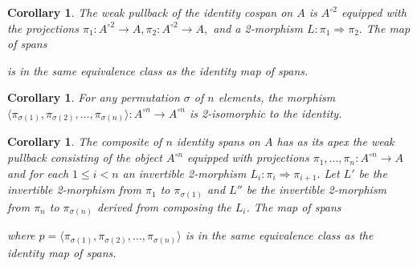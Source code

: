 \documentclass{article}
\newcommand{\maps}{\colon}
\newtheorem{cor}[thm]{Corollary}
\begin{document}
\begin{cor}
  The weak pullback of the identity cospan on $A$ is $A^{\circ 2}$ equipped with the projections $\pi_1\maps A^{\circ 2}\to A, \pi_2\maps A^{\circ 2}\to A,$ and a 2-morphism $L\maps \pi_1\Rightarrow \pi_2.$  The map of spans
  \begin{center}
  \end{center}
  is in the same equivalence class as the identity map of spans.
\end{cor}

\begin{cor}
  For any permutation $\sigma$ of $n$ elements, the morphism $\langle \pi_{\sigma(1)}, \pi_{\sigma(2)}, \ldots, \pi_{\sigma(n)}\rangle\maps A^{\circ n} \to A^{\circ n}$ is 2-isomorphic to the identity.
\end{cor}

\begin{cor}
  \label{permute}
  The composite of $n$ identity spans on $A$ has as its apex the weak pullback consisting of the object $A^{\circ n}$ equipped with projections $\pi_1, \ldots, \pi_n\maps A^{\circ n} \to A$ and for each $1 \le i < n$ an invertible 2-morphism $L_i\maps \pi_i \Rightarrow \pi_{i+1}.$  Let $L'$ be the invertible 2-morphism from $\pi_1$ to $\pi_{\sigma(1)}$ and $L''$ be the invertible 2-morphism from $\pi_n$ to $\pi_{\sigma(n)}$ derived from composing the $L_i$.  The map of spans 
  \begin{center}
  \end{center}
  where $p = \langle \pi_{\sigma(1)}, \pi_{\sigma(2)}, \ldots, \pi_{\sigma(n)}\rangle$ is in the same equivalence class as the identity map of spans.
\end{cor}  
\end{document}
